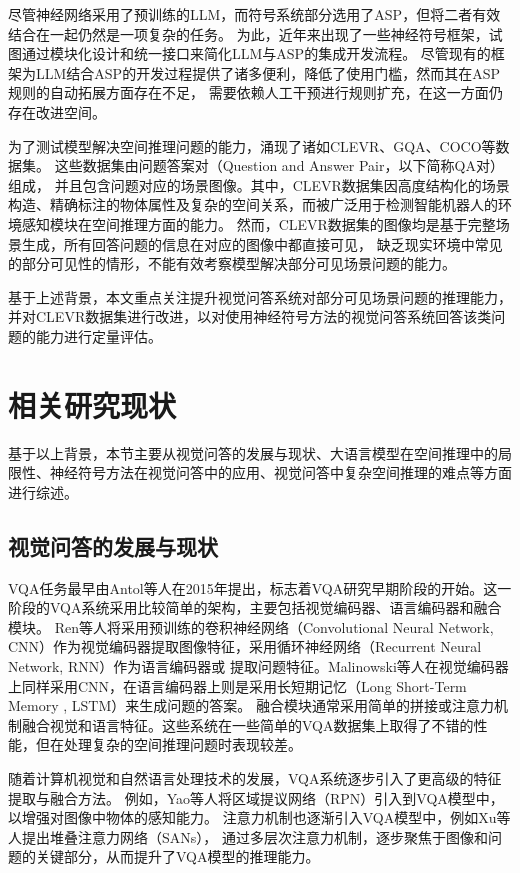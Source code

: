 尽管神经网络采用了预训练的LLM，而符号系统部分选用了ASP，但将二者有效结合在一起仍然是一项复杂的任务。
为此，近年来出现了一些神经符号框架，试图通过模块化设计和统一接口来简化LLM与ASP的集成开发流程\cite{wang2024dspybasedneuralsymbolicpipelineenhance}。
尽管现有的框架为LLM结合ASP的开发过程提供了诸多便利，降低了使用门槛，然而其在ASP规则的自动拓展方面存在不足，
需要依赖人工干预进行规则扩充，在这一方面仍存在改进空间。

为了测试模型解决空间推理问题的能力，涌现了诸如CLEVR、GQA、COCO等数据集。
这些数据集由问题答案对（Question and Answer Pair，以下简称QA对）组成，
并且包含问题对应的场景图像。其中，CLEVR数据集因高度结构化的场景构造、精确标注的物体属性及复杂的空间关系，而被广泛用于检测智能机器人的环境感知模块在空间推理方面的能力。
然而，CLEVR数据集的图像均是基于完整场景生成，所有回答问题的信息在对应的图像中都直接可见，
缺乏现实环境中常见的部分可见性的情形，不能有效考察模型解决部分可见场景问题的能力\cite{sam-abraham-etal-2024-clevr}。

基于上述背景，本文重点关注提升视觉问答系统对部分可见场景问题的推理能力，
并对CLEVR数据集进行改进，以对使用神经符号方法的视觉问答系统回答该类问题的能力进行定量评估。
\section{相关研究现状}
基于以上背景，本节主要从视觉问答的发展与现状、大语言模型在空间推理中的局限性、神经符号方法在视觉问答中的应用、视觉问答中复杂空间推理的难点等方面进行综述。

\subsection{视觉问答的发展与现状}
VQA任务最早由Antol\cite{Antol2015VQA}等人在2015年提出，标志着VQA研究早期阶段的开始。这一阶段的VQA系统采用比较简单的架构，主要包括视觉编码器、语言编码器和融合模块。
Ren\cite{ren2015exploring}等人将采用预训练的卷积神经网络（Convolutional Neural Network, CNN）作为视觉编码器提取图像特征，采用循环神经网络（Recurrent Neural Network, RNN）作为语言编码器或
提取问题特征。Malinowski\cite{malinowski2015neural}等人在视觉编码器上同样采用CNN，在语言编码器上则是采用长短期记忆（Long Short-Term Memory , LSTM）来生成问题的答案。
融合模块通常采用简单的拼接或注意力机制融合视觉和语言特征。这些系统在一些简单的VQA数据集上取得了不错的性能，但在处理复杂的空间推理问题时表现较差。

随着计算机视觉和自然语言处理技术的发展，VQA系统逐步引入了更高级的特征提取与融合方法。
例如，Yao\cite{lu2019look}等人将区域提议网络（RPN）引入到VQA模型中，以增强对图像中物体的感知能力。
注意力机制也逐渐引入VQA模型中，例如Xu\cite{xu2016stacked}等人提出堆叠注意力网络（SANs），
通过多层次注意力机制，逐步聚焦于图像和问题的关键部分，从而提升了VQA模型的推理能力。

